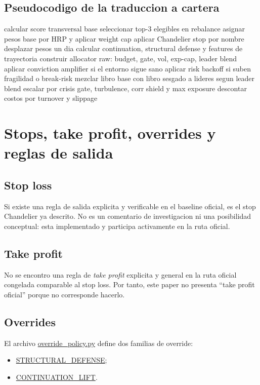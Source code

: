 \documentclass[11pt,letterpaper]{article}
\newcommand{\code}[1]{{\urlstyle{tt}\url{#1}}}
\begin{document}
\subsection{Pseudocodigo de la traduccion a cartera}
\begin{algorithm}[H]
\caption{Traduccion semanal desde score a cartera final}
\label{alg:overlay}
\begin{algorithmic}[1]
\State calcular score transversal base
\State seleccionar top-3 elegibles en rebalance
\State asignar pesos base por HRP y aplicar weight cap
\State aplicar Chandelier stop por nombre
\State desplazar pesos un dia
\State calcular continuation, structural defense y features de trayectoria
\State construir allocator raw: budget, gate, vol, exp-cap, leader blend
\State aplicar conviction amplifier si el entorno sigue sano
\State aplicar risk backoff si suben fragilidad o break-risk
\State mezclar libro base con libro sesgado a lideres segun leader blend
\State escalar por crisis gate, turbulence, corr shield y max exposure
\State descontar costos por turnover y slippage
\end{algorithmic}
\end{algorithm}

\section{Stops, take profit, overrides y reglas de salida}
\subsection{Stop loss}
Si existe una regla de salida explicita y verificable en el baseline oficial, es el stop Chandelier ya descrito. No es un comentario de investigacion ni una posibilidad conceptual: esta implementado y participa activamente en la ruta oficial.

\subsection{Take profit}
No se encontro una regla de \emph{take profit} explicita y general en la ruta oficial congelada comparable al stop loss. Por tanto, este paper no presenta \enquote{take profit oficial} porque no corresponde hacerlo.

\subsection{Overrides}
El archivo \code{override\_policy.py} define dos familias de override:
\begin{itemize}
    \item \code{STRUCTURAL\_DEFENSE};
    \item \code{CONTINUATION\_LIFT}.
\end{itemize}
\end{document}
